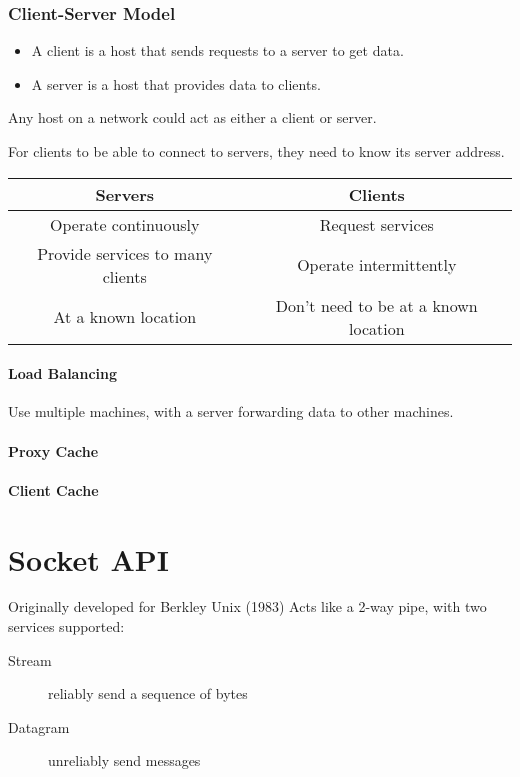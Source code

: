 \documentclass{article}
\begin{document}
\subsubsection{Client-Server Model}
\begin{itemize}
    \setlength{\itemsep}{0em}
    \item A client is a host that sends requests to a server to get data.
    \item A server is a host that provides data to clients.
\end{itemize}

Any host on a network could act as either a client or server.

For clients to be able to connect to servers, they need to know its server
address.

\begin{tabular}{cc}
    Servers                          & Clients                              \\
    \hline
    Operate continuously             & Request services                     \\
    Provide services to many clients & Operate intermittently               \\
    At a known location              & Don't need to be at a known location \\
\end{tabular}

\paragraph{Load Balancing} Use multiple machines, with a server forwarding data
to other machines.
\paragraph{Proxy Cache}
\paragraph{Client Cache}

\section{Socket API}
Originally developed for Berkley Unix (1983)
Acts like a 2-way pipe, with two services supported:
\begin{description}
    \item[Stream]  reliably send a sequence of bytes
    \item[Datagram] unreliably send messages
\end{description}
\end{document}
